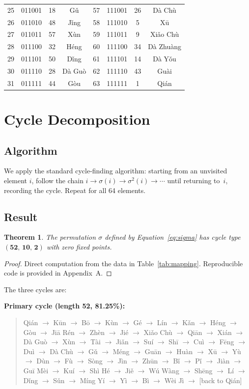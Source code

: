 \documentclass[11pt,a4paper]{article}
\newtheorem{theorem}{Theorem}
\begin{document}
\begin{table}[ht]
\begin{tabular}{@{}cccc|cccc@{}}
25 & 011001 & 18 & Gǔ & 57 & 111001 & 26 & Dà Chù \\
26 & 011010 & 48 & Jǐng & 58 & 111010 & 5 & Xū \\
27 & 011011 & 57 & Xùn & 59 & 111011 & 9 & Xiǎo Chù \\
28 & 011100 & 32 & Héng & 60 & 111100 & 34 & Dà Zhuàng \\
29 & 011101 & 50 & Dǐng & 61 & 111101 & 14 & Dà Yǒu \\
30 & 011110 & 28 & Dà Guò & 62 & 111110 & 43 & Guài \\
31 & 011111 & 44 & Gòu & 63 & 111111 & 1 & Qián \\
\bottomrule
\end{tabular}
\end{table}


\section{Cycle Decomposition}\label{sec:cycles}

\subsection{Algorithm}

We apply the standard cycle-finding algorithm: starting from an unvisited element $i$, follow the chain $i \to \sigma(i) \to \sigma^2(i) \to \cdots$ until returning to~$i$, recording the cycle.
Repeat for all 64 elements.

\subsection{Result}

\begin{theorem}\label{thm:main}
The permutation $\sigma$ defined by Equation~\eqref{eq:sigma} has cycle type $\mathbf{(52,\, 10,\, 2)}$ with zero fixed points.
\end{theorem}

\begin{proof}
Direct computation from the data in Table~\ref{tab:mapping}.
Reproducible code is provided in Appendix~A.
\end{proof}

The three cycles are:

\medskip
\noindent\textbf{Primary cycle (length 52, 81.25\%):}
\begin{quote}\small
Qián $\to$ Kūn $\to$ Bō $\to$ Kùn $\to$ Gé $\to$ Lín $\to$ Kǎn $\to$ Héng $\to$ Gòu $\to$ Jiā Rén $\to$ Zhèn $\to$ Jié $\to$ Xiǎo Chù $\to$ Qiān $\to$ Xián $\to$ Dà Guò $\to$ Xùn $\to$ Tài $\to$ Jiǎn $\to$ Suí $\to$ Shī $\to$ Cuì $\to$ Fēng $\to$ Duì $\to$ Dà Chù $\to$ Gǔ $\to$ Méng $\to$ Guān $\to$ Huàn $\to$ Xū $\to$ Yù $\to$ Dùn $\to$ Fù $\to$ Sòng $\to$ Jìn $\to$ Zhūn $\to$ Bǐ $\to$ Pǐ $\to$ Jiàn $\to$ Guī Mèi $\to$ Kuí $\to$ Shì Hé $\to$ Jiě $\to$ Wú Wàng $\to$ Shēng $\to$ Lí $\to$ Dǐng $\to$ Sǔn $\to$ Míng Yí $\to$ Yì $\to$ Bì $\to$ Wèi Jì $\to$ [back to Qián]
\end{quote}
\end{document}
